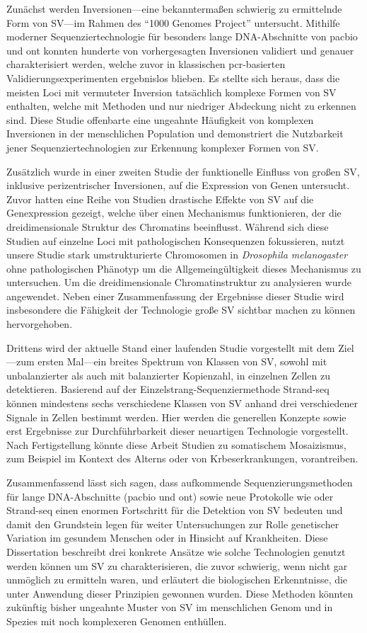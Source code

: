 Zunächst werden Inversionen---eine bekanntermaßen schwierig zu ermittelnde Form
von SV---im Rahmen des ``1000 Genomes Project'' untersucht. Mithilfe moderner
Sequenziertechnologie für besonders lange DNA\--Ab\-schnit\-te von \acl{pacbio}
und \acl{ont} konnten hunderte von vor\-her\-ge\-sag\-ten Inversionen validiert und
genauer cha\-rak\-te\-ri\-siert werden, welche zuvor in klassischen \acs{pcr}-basierten
Validierungsexperimenten ergebnislos blieben. Es stellte sich heraus, dass die
meis\-ten Loci mit vermuteter Inversion tatsächlich komplexe Formen von SV
enthalten, welche mit \mps Methoden und nur niedriger Abdeckung nicht zu
erkennen sind. Diese Studie offenbarte eine ungeahnte Häufigkeit von komplexen
Inversionen in der menschlichen Population und demonstriert die Nutzbarkeit
jener Sequenziertechnologien zur Erkennung komplexer Formen von SV.

Zusätzlich wurde in einer zweiten Studie der funktionelle Einfluss von großen SV,
inklusive perizentrischer Inversionen, auf die Expression von Genen untersucht.
Zuvor hatten eine Reihe von Studien drastische Effekte von SV auf die
Genexpression gezeigt, welche über einen Mechanismus funktionieren, der die
dreidimensionale Struktur des Chromatins beeinflusst. Während sich diese Studien
auf einzelne Loci mit pathologischen Konsequenzen fokussieren, nutzt unsere
Studie stark umstrukturierte Chromosomen in \textit{Drosophila melanogaster}
ohne pathologischen Phänotyp um die Allgemeingültigkeit dieses Mechanismus zu
untersuchen. Um die dreidimensionale Chromatinstruktur zu analysieren wurde \hic
angewendet. Neben einer Zusammenfassung der Ergebnisse dieser Studie wird
insbesondere die Fähigkeit der \hic Technologie große SV sichtbar machen zu
können hervorgehoben.

Drittens wird der aktuelle Stand einer laufenden Studie vorgestellt mit dem
Ziel---zum ersten Mal---ein breites Spektrum von Klassen von SV, sowohl mit unbalanzierter
als auch mit balanzierter Kopienzahl, in einzelnen Zellen zu detektieren.
Basierend auf der Ein\-zel\-strang-Se\-quen\-zier\-me\-tho\-de Strand-seq können
mindestens sechs verschiedene Klas\-sen von SV anhand drei verschiedener Signale
in Zellen bestimmt werden. Hier werden die generellen Konzepte sowie erst
Ergebnisse zur Durchführbarkeit dieser neuartigen Technologie
vorgestellt. Nach Fertigstellung könnte diese Arbeit Studien zu somatischem
Mosaizismus, zum Beispiel im Kontext des Alterns oder von Krbeserkrankungen,
vorantreiben.

Zusammenfassend lässt sich sagen, dass aufkommende Sequenzierungsmethoden für
lange DNA-Ab\-schnit\-te (\acl{pacbio} und \acl{ont}) sowie neue Protokolle wie
\hic oder Strand-seq einen enormen Fortschritt für die Detektion von SV bedeuten
und damit den Grundstein legen für weiter Untersuchungen zur Rolle genetischer
Variation im gesundem Menschen oder in Hinsicht auf Krankheiten. Diese
Dissertation beschreibt drei konkrete Ansätze wie solche Technologien genutzt
werden können um SV zu charakterisieren, die zuvor schwierig, wenn nicht gar
unmöglich zu ermitteln waren, und erläutert die biologischen Erkenntnisse, die
unter Anwendung dieser Prinzipien gewonnen wurden. Diese Methoden könnten
zukünftig bisher ungeahnte Muster von SV im menschlichen Genom und in Spezies
mit noch komplexeren Genomen enthüllen.
